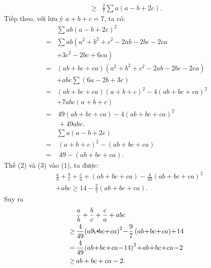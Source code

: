 \begin{multicols}{2}
\begin{align*}
		\ge &\frac{2}{7}\sum {a\left( {a - b + 2c} \right)}. \tag{$1$}
	\end{align*}
	Tiếp theo, với lưu ý $a + b + c = 7$, ta có:
	\begin{align*}
			&\sum {ab{{\left( {a - b + 2c} \right)}^2}} \\[-0.1ex]
			 = &\sum ab\left( {a^2} + {b^2} + {c^2} - 2ab - 2bc - 2ca\right. \\[-0.1ex]
			 		&\left.+ 3{c^2} - 2bc + 6ca \right)\\[-0.1ex]
			 = &\left( {ab \!+\! bc \!+\! ca} \right)\!\!\left(\! {{a^2} \!+\! {b^2} \!+\! {c^2} \!-\! 2ab \!-\! 2bc \!-\! 2ca} \!\right) \\[-0.1ex]
			 &+\! abc\sum {\left( {6a \!-\! 2b \!+\! 3c} \right)} \\[-0.1ex]
			 = &\left( {ab \!+\! bc \!+\! ca} \right)\!\!{\left( {a \!+\! b \!+\! c} \right)^2} \!-\! 4{\left( {ab \!+\! bc \!+\! ca} \right)^2} \\[-0.1ex]
			 &+ 7abc\left( {a \!+\! b \!+\! c} \right)\\[-0.1ex]
			=&\,49\left( {ab \!+\! bc \!+\! ca} \right) \!-\! 4{\left( {ab \!+\! bc \!+\! ca} \right)^2} \\[-0.1ex]
			&\,+ 49abc. \tag{$2$}\\[-0.1ex]
		&\sum {a\left( {a - b + 2c} \right)}  \\[-0.1ex]
		= &\,{\left( {a + b + c} \right)^2} - \left( {ab + bc + ca} \right) \\[-0.1ex]
		= &\,\,49 - \left( {ab + bc + ca} \right). \tag{$3$}
	\end{align*}
	Thế ($2$) và ($3$) vào ($1$), ta được:
	\begin{align*}
		&\frac{a}{b} \!+\! \frac{b}{c} \!+\! \frac{c}{a} \!+\! \left( {ab \!+\! bc \!+\! ca} \right) \!-\! \frac{4}{{49}}{\left( {ab \!+\! bc \!+\! ca} \right)^2} \\
		&+\! abc \ge 14 \!-\! \frac{2}{7}\left( {ab \!+\! bc \!+\! ca} \right).
	\end{align*}
	Suy ra
	\begin{align*}
			&\frac{a}{b} + \frac{b}{c} + \frac{c}{a} + abc\\
			 \ge \,&\frac{4}{{49}}{\left( {ab \!\+\! bc \!+\! ca} \right)^2} \!-\! \frac{9}{7}\left( {ab \!+\! bc \!+\! ca} \right) \!+\! 14\\
			 = \,&\frac{4}{{49}}{\left( {ab \!+\! bc \!+\! ca \!-\! 14} \right)^2} \!+\! ab \!+\! bc \!+\! ca \!-\! 2\\
			 \ge \,&ab + bc + ca - 2.
	\end{align*}

\end{multicols}
